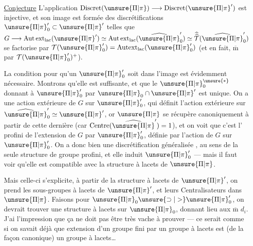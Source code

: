 \uline{Conjecture} L'application \(\mathrm{Discret}(\unsure{\Pi|\pi})\longrightarrow\mathrm{Discret}(\unsure{\Pi|\pi}')\)
est injective, et son image est formée des
discrétifications \(\unsure{\Pi|\pi}'_0\subset\unsure{\Pi|\pi}'\) telles que
\(G\longrightarrow\mathrm{Aut\,ext}_{\mathrm{lac}}(\unsure{\Pi|\pi}')
\simeq\mathrm{Aut\,ext}_{\mathrm{lac}}(\widehat{\unsure{\Pi|\pi}}'_0)
\simeq\widehat{\widehat{\mathcal T}}(\widehat{\unsure{\Pi|\pi}}'_0)\)
se factorise par \(\mathcal T(\unsure{\Pi|\pi}'_0)=\mathrm{Autext}_{\mathrm{lac}}(\unsure{\Pi|\pi}'_0)\)
(et en fait, \(\overline{\mathrm m}\) par \(\mathcal T(\unsure{\Pi|\pi}'_0)^+\)).


La condition pour qu'un  \(\unsure{\Pi|\pi}'_0\) soit dans
l'image est évidemment nécessaire. Montrons
qu'elle est suffisante, et que le \(\unsure{\Pi|\pi}_0^{\unsure{*}}\) donnant
 à \(\unsure{\Pi|\pi}'_0\) par \(\unsure{\Pi|\pi}_0\cap\unsure{\Pi|\pi}'\) est unique.
On a une action extérieure de \(G\) sur \(\unsure{\Pi|\pi}'_0\),
qui définit l'action extérieure sur \(\widehat{\unsure{\Pi|\pi}}'_0\simeq\unsure{\Pi|\pi}'\),
or \(\unsure{\Pi|\pi}\) se récupère canoniquement à partir de
cette dernière (car \(\mathrm{Centre}(\widehat{\unsure{\Pi|\pi}}')=1\)), et on
voit que c'est l'   profini de
l'extension  de \(G\) par \(\unsure{\Pi|\pi}'_0\), définie par l'action
 de \(G\) sur \(\unsure{\Pi|\pi}'_0\). On a donc bien une
discrétification généralisée , au sens de la
seule structure de  groupe profini, et elle
induit \(\unsure{\Pi|\pi}'_0\) --- mais il faut voir qu'elle
est compatible avec la structure à lacets de \(\unsure{\Pi|\pi}\).

Mais celle-ci s'explicite, à partir de la
structure à lacets de \(\unsure{\Pi|\pi}'\), on prend les
sous-groupes à lacets  de \(\unsure{\Pi|\pi}'\), et leurs
Centralisateurs dans \(\unsure{\Pi|\pi}\). Faisons  pour
\(\unsure{\Pi|\pi}_0\unsure{\supset|>}\unsure{\Pi|\pi}'_0\), on devrait trouver une structure
à lacets sur \(\unsure{\Pi|\pi}_0\), donnant lieu aux
\(\overline{\mathrm m}\) \(d_i\).
J'ai l'impression que ça ne
doit pas être très vache à prouver --- ce
serait comme si on savait déjà que 
extension  d'un groupe fini par un
groupe à lacets est (de la façon canonique)
un groupe à lacets\ldots

